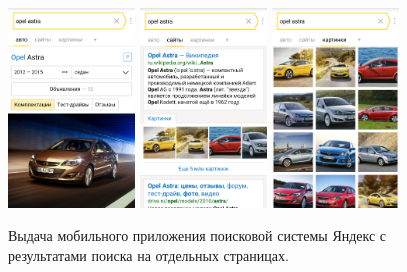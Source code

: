 \documentclass[12pt,a4paper]{report}
\begin{document}
\begin{figure}[t!]
  \centering
  \includegraphics[width=0.3\textwidth]{pics/MultiPageSerp-Yandex-1.png}
  \includegraphics[width=0.3\textwidth]{pics/MultiPageSerp-Yandex-2.png}
  \includegraphics[width=0.3\textwidth]{pics/MultiPageSerp-Yandex-3.png}
  \caption{Выдача мобильного приложения поисковой системы Яндекс с результатами поиска на отдельных страницах.}
  \label{yandex-mobile-app-serp}
\end{figure}

\end{document}
